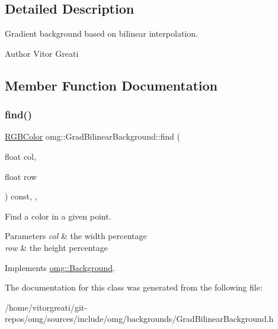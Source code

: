 \subsection{Detailed Description}
Gradient background based on bilinear interpolation. 

\begin{DoxyAuthor}{Author}
Vitor Greati 
\end{DoxyAuthor}


\subsection{Member Function Documentation}
\mbox{\label{classomg_1_1_grad_bilinear_background_a074c489f7e8514420bd1e1f362202b03}} 
\subsubsection{\texorpdfstring{find()}{find()}}
{\footnotesize\ttfamily \mbox{\hyperlink{namespaceomg_a92d9bbc48ad35def2aa4b0ac3a5b22ae}{R\+G\+B\+Color}} omg\+::\+Grad\+Bilinear\+Background\+::find (\begin{DoxyParamCaption}\item[{float}]{col,  }\item[{float}]{row }\end{DoxyParamCaption}) const\hspace{0.3cm}{\ttfamily [inline]}, {\ttfamily [override]}, {\ttfamily [virtual]}}



Find a color in a given point. 


\begin{DoxyParams}{Parameters}
{\em col} & the width percentage \\
\hline
{\em row} & the height percentage \\
\hline
\end{DoxyParams}


Implements \mbox{\hyperlink{classomg_1_1_background_a9f98d6bc2e213de258b5c3e45040b462}{omg\+::\+Background}}.



The documentation for this class was generated from the following file\+:\begin{DoxyCompactItemize}
\item 
/home/vitorgreati/git-\/repos/omg/sources/include/omg/backgrounds/Grad\+Bilinear\+Background.\+h\end{DoxyCompactItemize}
